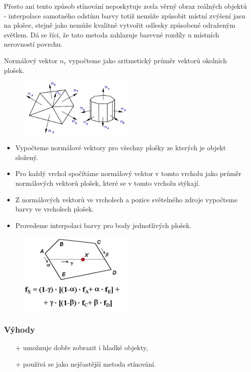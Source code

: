 Přesto ani tento způsob stínování neposkytuje zcela věrný obraz reálných objektů - interpolace samotného odstínu barvy totiž nemůže způsobit místní zvýšení jasu na plošce, stejně jako nemůže kvalitně vytvořit odlesky způsobené odraženým světlem. Dá se říci, že tato metoda zahlazuje barevné rozdíly u místních nerovností povrchu.

Normálový vektor $n_r$ vypočteme jako aritmetický průměr vektorů okolních plošek.
		\begin{figure}[H]
		\centering
		\includegraphics[width=0.5\textwidth]{assets/5_gouraud}
		\end{figure}

\begin{itemize}
	\item Vypočteme normálové vektory pro všechny plošky ze kterých je objekt složený.
	\item Pro každý vrchol spočítáme normálový vektor v tomto vrcholu jako průměr normálových vektorů plošek, které se v tomto vrcholu stýkají.
	\item Z normálových vektorů ve vrcholech a pozice světelného zdroje vypočteme barvy ve vrcholech plošek.
	\item Provedeme interpolaci barvy pro body jednotlivých plošek.
\end{itemize}
		\begin{figure}[H]
		\centering
		\includegraphics[width=0.5\textwidth]{assets/5_gouradovo}
		\end{figure} 
		\subsubsection*{Výhody}
			\begin{itemize}
				\item[$+$] umožnuje dobře zobrazit i hladké objekty,
				\item[$+$] používá se jako nejčastější metoda stínování.
			\end{itemize}
